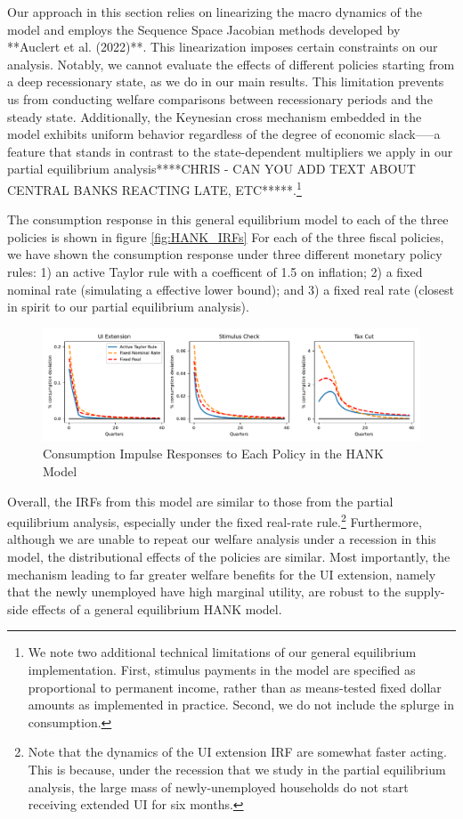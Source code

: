 \documentclass[\econtexRoot/HAFiscal]{subfiles}
\begin{document}
Our approach in this section relies on linearizing the macro dynamics of the model and employs the Sequence Space Jacobian methods developed by **Auclert et al. (2022)**. This linearization imposes certain constraints on our analysis. Notably, we cannot evaluate the effects of different policies starting from a deep recessionary state, as we do in our main results. This limitation prevents us from conducting welfare comparisons between recessionary periods and the steady state. Additionally, the Keynesian cross mechanism embedded in the model exhibits uniform behavior regardless of the degree of economic slack—--a feature that stands in contrast to the state-dependent multipliers we apply in our partial equilibrium analysis****CHRIS - CAN YOU ADD TEXT ABOUT CENTRAL BANKS REACTING LATE, ETC*****.\footnote{We note two additional technical limitations of our general equilibrium implementation. First, stimulus payments in the model are specified as proportional to permanent income, rather than as means-tested fixed dollar amounts as implemented in practice. Second, we do not include the splurge in consumption.}



The consumption response in this general equilibrium model to each of the three policies is shown in figure \ref{fig:HANK_IRFs} For each of the three fiscal policies, we have shown the consumption response under three different monetary policy rules: 1) an active Taylor rule with a coefficent of 1.5 on inflation; 2) a fixed nominal rate (simulating a effective lower bound); and 3) a fixed real rate (closest in spirit to our partial equilibrium analysis).


\begin{figure}[th]
	\begin{center}
		\includegraphics[width=.9\textwidth]{../Figures/HANK_IRFs.pdf}
		\caption{Consumption Impulse Responses to Each Policy in the HANK Model}
		\notinsubfile{\label{fig:HANK_IRFs}}
	\end{center}
\end{figure}


Overall, the IRFs from this model are similar to those from the partial equilibrium analysis, especially under the fixed real-rate rule.\footnote{Note that the dynamics of the UI extension IRF are somewhat faster acting. This is because, under the recession that we study in the partial equilibrium analysis, the large mass of newly-unemployed households do not start receiving extended UI for six months. } Furthermore, although we are unable to repeat our welfare analysis under a recession in this model, the distributional effects of the policies are similar. Most importantly, the mechanism leading to far greater welfare benefits for the UI extension, namely that the newly unemployed have high marginal utility, are robust to the supply-side effects of a general equilibrium HANK model.
\end{document}

